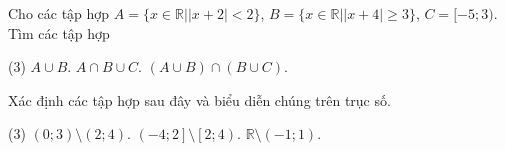 \begin{vd}%
	Cho các tập hợp $A=\{x\in \mathbb{R}| |x+2|<2\}$, $B=\{x\in \mathbb{R}| |x+4|\geq 3\}$, $C=[-5;3)$. Tìm các tập hợp
	\begin{tasks}(3)
		\task $A \cup B$.
		\task $A \cap B \cup C$.
		\task $(A \cup B)\cap(B \cup C)$.
	\end{tasks}
\end{vd}

\begin{vd}%
	Xác định các tập hợp sau đây và biểu diễn chúng trên trục số.
	\begin{tasks}(3)
		\task $\left(0;3\right)\setminus \left(2;4\right).$
		\task $\left(-4;2\right]\setminus \left[2;4\right).$
		\task $\mathbb{R}\setminus \left(-1;1\right).$
	\end{tasks}
\end{vd}

